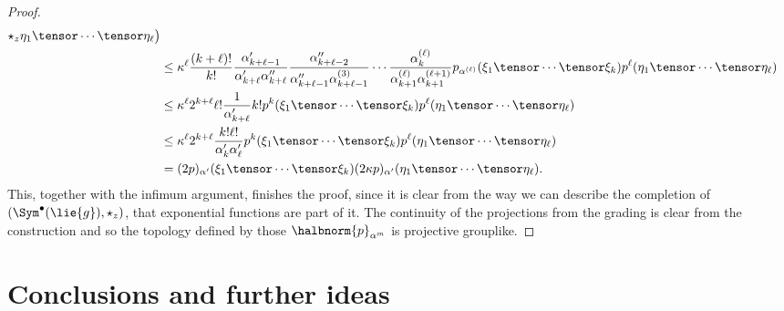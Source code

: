 \documentclass[
11pt,                          %
english                        %
]{article}
\begin{document}
\begin{proof}
\begin{align*}
			\star_z
			\eta_1 \tensor \cdots \tensor \eta_\ell
		\big)
		\\
		& \leq
		\kappa^\ell
		\frac{(k + \ell)!}{k!}
		\frac{\alpha_{k + \ell - 1}'}{\alpha_{k + \ell}' \alpha_{k+\ell}''}
		\frac{\alpha_{k + \ell - 2}''}
		{\alpha_{k + \ell - 1}'' \alpha_{k+\ell-1}^{(3)}}
		\cdots
		\frac{\alpha_{k}^{(\ell)}}
		{\alpha_{k + 1}^{(\ell)} \alpha_{k+1}^{(\ell + 1)}}
		p_{\alpha^{(\ell)}} (\xi_1 \tensor \cdots \tensor \xi_k)
		p^\ell ( \eta_1 \tensor \cdots \tensor \eta_\ell )
		\\
		& \leq
		\kappa^\ell
		2^{k + \ell}
		\ell!
		\frac{1}{\alpha_{k + \ell}'}
		k!
		p^k (\xi_1 \tensor \cdots \tensor \xi_k)
		p^\ell ( \eta_1 \tensor \cdots \tensor \eta_\ell )
		\\
		& \leq
		\kappa^\ell
		2^{k + \ell}
		\frac{k! \ell!}{\alpha_k' \alpha_\ell '}
		p^k (\xi_1 \tensor \cdots \tensor \xi_k)
		p^\ell ( \eta_1 \tensor \cdots \tensor \eta_\ell )
		\\
		&=
		(2p)_{\alpha'} (\xi_1 \tensor \cdots \tensor \xi_k)
		(2 \kappa p)_{\alpha'} ( \eta_1 \tensor \cdots \tensor \eta_\ell ).
	\end{align*}
	This, together with the infimum argument, finishes the proof, since it is clear 
	from the way we can describe the completion of $\left( \Sym^{\bullet}(\lie{g}), 
	\star_z \right)$, that exponential functions are part of it. The continuity of 
	the projections from the grading is clear from the construction and so the 
	topology defined by those $\halbnorm{p}_{\alpha^{m}}$ is projective grouplike.
\end{proof}



\section{Conclusions and further ideas}
\end{document}
